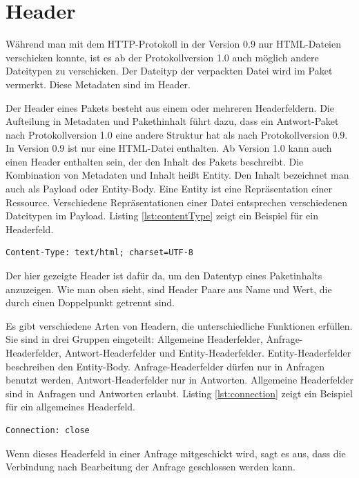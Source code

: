 \documentclass{llncs}
\begin{document}
\section{Header}
Während man mit dem HTTP-Protokoll in der Version 0.9 nur HTML-Dateien
verschicken konnte, ist es ab der Protokollversion 1.0 auch möglich andere
Dateitypen zu verschicken. Der Dateityp der verpackten Datei wird im Paket
vermerkt. Diese Metadaten sind im Header.

Der Header eines Pakets besteht aus einem oder mehreren Headerfeldern.
Die Aufteilung in Metadaten und Pakethinhalt führt dazu, dass ein Antwort-Paket nach Protokollversion 1.0 eine andere Struktur hat als nach
Protokollversion 0.9. In Version 0.9 ist nur eine HTML-Datei enthalten.
Ab Version 1.0 kann auch einen Header enthalten sein, der den
Inhalt des Pakets beschreibt. Die Kombination von Metadaten und Inhalt heißt Entity. Den Inhalt bezeichnet man auch als Payload oder Entity-Body. Eine Entity ist eine Repräsentation einer Ressource. Verschiedene Repräsentationen einer Datei entsprechen verschiedenen Dateitypen im Payload. \cite{Berners-Lee1996} 
Listing \ref{lst:contentType} zeigt ein Beispiel für ein Headerfeld.
\begin{lstlisting}[caption={Content-Type Headerfeld},label={lst:contentType}]
Content-Type: text/html; charset=UTF-8
\end{lstlisting} 

Der hier gezeigte Header ist dafür da, um den Datentyp eines Paketinhalts anzuzeigen. Wie man oben sieht, sind Header Paare aus Name und Wert, die durch einen Doppelpunkt getrennt sind.

Es gibt verschiedene Arten von Headern, die unterschiedliche Funktionen erfüllen. Sie sind in drei Gruppen eingeteilt: Allgemeine Headerfelder, Anfrage-Headerfelder, Antwort-Headerfelder und Entity-Headerfelder.
Entity-Headerfelder beschreiben den Entity-Body. Anfrage-Headerfelder dürfen nur in Anfragen benutzt werden, Antwort-Headerfelder nur in Antworten.  Allgemeine Headerfelder sind in Anfragen und Antworten erlaubt. Listing \ref{lst:connection} zeigt ein Beispiel für ein allgemeines Headerfeld. 

\lstset{ 
  xleftmargin=.35\textwidth, xrightmargin=.2\textwidth,
  basicstyle=\ttfamily
}
\begin{lstlisting}[caption={Connection-Headerfeld},label={lst:connection}]
Connection: close
\end{lstlisting}

Wenn dieses Headerfeld in einer Anfrage mitgeschickt wird, sagt es aus, dass die Verbindung nach Bearbeitung der Anfrage geschlossen werden kann. 
\end{document}
